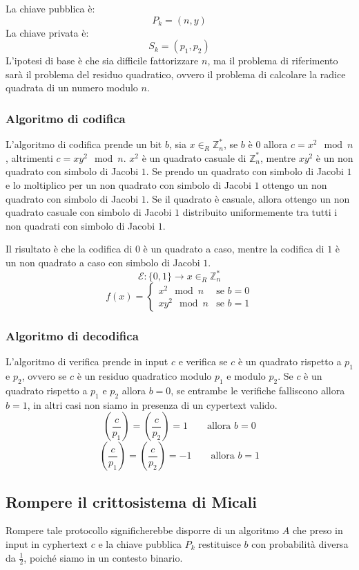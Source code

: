 La chiave pubblica è:
\[
  P_k = (n, y)
\]
La chiave privata è:
\[
  S_k = (p_1, p_2)
\]
L'ipotesi di base è che sia difficile fattorizzare $n$, ma il problema di 
riferimento sarà il problema del residuo quadratico, ovvero il problema di
calcolare la radice quadrata di un numero modulo $n$.
\subsubsection{Algoritmo di codifica}
L'algoritmo di codifica prende un bit $b$, sia $x \in_R \mathbb{Z}_n^*$, se 
$b$ è $0$ allora $c = x^2 \mod n$, altrimenti $c = xy^2 \mod n$. 
$x^2$ è un quadrato casuale di $\mathbb{Z}_n^*$, mentre $xy^2$ è un 
non quadrato con simbolo di Jacobi $1$. Se prendo un quadrato con simbolo di 
Jacobi $1$ e lo moltiplico per un non quadrato con simbolo di Jacobi $1$ ottengo
un non quadrato con simbolo di Jacobi $1$. Se il quadrato è casuale, allora 
ottengo un non quadrato casuale con simbolo di Jacobi $1$ distribuito uniformemente
tra tutti i non quadrati con simbolo di Jacobi $1$.

Il risultato è che la codifica di $0$ è un quadrato a caso, mentre la codifica di $1$ è
un non quadrato a caso con simbolo di Jacobi $1$.
\[
  \mathcal{E}: \{0, 1\} \to x \in_R \mathbb{Z}_n^*
\]
\[
  f(x) = \begin{cases}
    x^2 \mod n & \text{se } b = 0\\
    xy^2 \mod n & \text{se } b = 1
  \end{cases}
\]
\subsubsection{Algoritmo di decodifica}
L'algoritmo di verifica prende in input $c$ e verifica se $c$ è un quadrato 
rispetto a $p_1$ e $p_2$, ovvero se $c$ è un residuo quadratico modulo $p_1$ e
modulo $p_2$. Se $c$ è un quadrato rispetto a $p_1$ e $p_2$ allora $b = 0$,
se entrambe le verifiche falliscono allora $b = 1$, in altri casi non siamo in presenza 
di un cypertext valido.
\[
  \left(\frac{c}{p_1}\right) = \left(\frac{c}{p_2}\right) = 1 \qquad \text{allora } b = 0
\]
\[
  \left(\frac{c}{p_1}\right) = \left(\frac{c}{p_2}\right) = -1 \qquad \text{allora } b = 1
\]
\subsection{Rompere il crittosistema di Micali}
Rompere tale protocollo significherebbe disporre di un algoritmo $A$ che preso in 
input in cyphertext $c$ e la chiave pubblica $P_k$ restituisce $b$ con probabilità
diversa da $\frac{1}{2}$, poiché siamo in un contesto binario.

